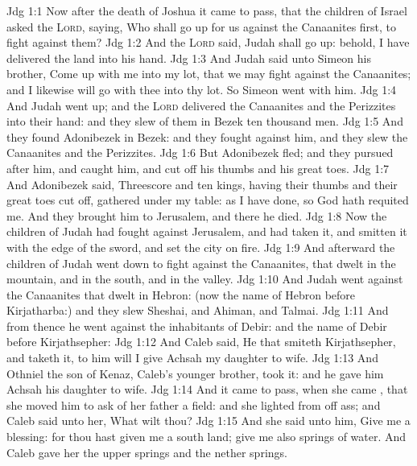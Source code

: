 \vs Jdg 1:1 Now after the death of Joshua it came to pass, that the children of Israel asked the \textsc{Lord}, saying, Who shall go up for us against the Canaanites first, to fight against them?
\vs Jdg 1:2 And the \textsc{Lord} said, Judah shall go up: behold, I have delivered the land into his hand.
\vs Jdg 1:3 And Judah said unto Simeon his brother, Come up with me into my lot, that we may fight against the Canaanites; and I likewise will go with thee into thy lot. So Simeon went with him.
\vs Jdg 1:4 And Judah went up; and the \textsc{Lord} delivered the Canaanites and the Perizzites into their hand: and they slew of them in Bezek ten thousand men.
\vs Jdg 1:5 And they found Adonibezek in Bezek: and they fought against him, and they slew the Canaanites and the Perizzites.
\vs Jdg 1:6 But Adonibezek fled; and they pursued after him, and caught him, and cut off his thumbs and his great toes.
\vs Jdg 1:7 And Adonibezek said, Threescore and ten kings, having their thumbs and their great toes cut off, gathered  under my table: as I have done, so God hath requited me. And they brought him to Jerusalem, and there he died.
\vs Jdg 1:8 Now the children of Judah had fought against Jerusalem, and had taken it, and smitten it with the edge of the sword, and set the city on fire.
\vs Jdg 1:9 And afterward the children of Judah went down to fight against the Canaanites, that dwelt in the mountain, and in the south, and in the valley.
\vs Jdg 1:10 And Judah went against the Canaanites that dwelt in Hebron: (now the name of Hebron before  Kirjatharba:) and they slew Sheshai, and Ahiman, and Talmai.
\vs Jdg 1:11 And from thence he went against the inhabitants of Debir: and the name of Debir before  Kirjathsepher:
\vs Jdg 1:12 And Caleb said, He that smiteth Kirjathsepher, and taketh it, to him will I give Achsah my daughter to wife.
\vs Jdg 1:13 And Othniel the son of Kenaz, Caleb's younger brother, took it: and he gave him Achsah his daughter to wife.
\vs Jdg 1:14 And it came to pass, when she came , that she moved him to ask of her father a field: and she lighted from off  ass; and Caleb said unto her, What wilt thou?
\vs Jdg 1:15 And she said unto him, Give me a blessing: for thou hast given me a south land; give me also springs of water. And Caleb gave her the upper springs and the nether springs.
